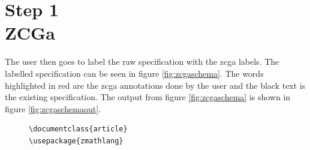 \section{Step 1\\ZCGa}

The user then goes to label the raw specification with the \gls{zcga} labels.
The labelled specification can be seen in figure \ref{fig:zcgaschema}. The words
highlighted in {\color{red}red} are the \gls{zcga} annotations done by the user
and the black text is the existing specification. The output from figure \ref{fig:zcgaschema}
is shown in figure \ref{fig:zcgaschemaout}.

\begin{figure}[H]
\centering
\begin{minipage}{0.45\textwidth}
\centering
\begin{tiny}
\begin{BVerbatim}[commandchars=+\[\]]
\documentclass{article}
\usepackage{zmathlang}


\end{BVerbatim}
\end{tiny}
\end{minipage}
\end{figure}
